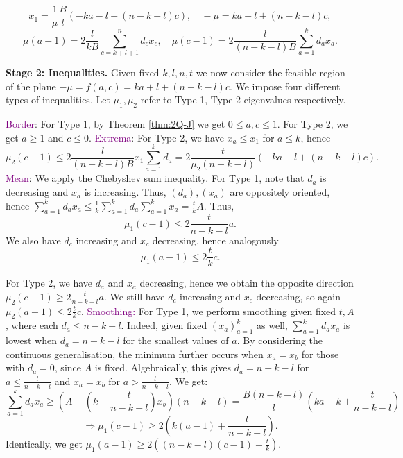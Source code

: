 \documentclass[11pt]{article}
\newcommand{\purp}[1]{\textcolor{purple}{#1}}
\begin{document}
\[x_1 = \frac{1}{\mu} \frac{B}{l} (-ka - l + (n-k-l)c), \quad -\mu = ka + l + (n-k-l)c,\]
\[\mu(a-1) = 2\frac{l}{kB} \sum_{c = k+l+1}^n d_cx_c, \quad \mu(c-1) = 2\frac{l}{(n-k-l)B} \sum_{a = 1}^k d_ax_a.\]
\vspace{3mm}

\textbf{Stage 2: Inequalities.} Given fixed $k, l, n, t$ we now consider the feasible region of the plane $-\mu = f(a, c) = ka + l + (n-k-l)c$. We impose four different types of inequalities. Let $\mu_1, \mu_2$ refer to Type 1, Type 2 eigenvalues respectively. 
\begin{outline}
    \1 \purp{Border}: For Type 1, by Theorem \ref{thm:2Q-J} we get $0 \le a, c \le 1$. For Type 2, we get $a \ge 1$ and $c \le 0$. 
    \1 \purp{Extrema}: For Type 2, we have $x_a \le x_1$ for $a \le k$, hence 
    \[\mu_2(c-1) \le 2\frac{l}{(n-k-l)B} x_1 \sum_{a = 1}^k d_a = 2\frac{t}{\mu_2(n-k-l)}(-ka - l + (n-k-l)c).\]
    \1 \purp{Mean}: We apply the Chebyshev sum inequality. For Type 1, note that $d_a$ is decreasing and $x_a$ is increasing. Thus, $(d_a), (x_a)$ are oppositely oriented, hence $\sum_{a=1}^k d_ax_a \le \frac1k \sum_{a=1}^k d_a \sum_{a=1}^k x_a = \frac{t}{k}A$. Thus, 
    \[\mu_1(c-1) \le 2\frac{t}{n-k-l}a.\]
    We also have $d_c$ increasing and $x_c$ decreasing, hence analogously
    \[\mu_1(a-1) \le 2\frac{t}{k}c.\]

    For Type 2, we have $d_a$ and $x_a$ decreasing, hence we obtain the opposite direction $\mu_2(c-1) \ge 2\frac{t}{n-k-l}a$. We still have $d_c$ increasing and $x_c$ decreasing, so again $\mu_2(a-1) \le 2\frac{t}{k}c$. 
    \1 \purp{Smoothing:} For Type 1, we perform smoothing given fixed $t, A$, where each $d_a \le n-k-l$. Indeed, given fixed $(x_a)_{a=1}^k$ as well, $\sum_{a=1}^k d_ax_a$ is lowest when $d_a = n-k-l$ for the smallest values of $a$. By considering the continuous generalisation, the minimum further occurs when $x_a = x_b$ for those with $d_a = 0$, since $A$ is fixed. Algebraically, this gives $d_a = n-k-l$ for $a \le \frac{t}{n-k-l}$ and $x_a = x_b$ for $a > \frac{t}{n-k-l}$. We get:
    \[\sum_{a=1}^k d_ax_a \ge (A - \left(k - \frac{t}{n-k-l}\right) x_b) (n-k-l) = \frac{B(n-k-l)}{l}\left(ka - k + \frac{t}{n-k-l}\right)\]
    \[\Rightarrow \mu_1(c-1) \ge 2(k(a-1) + \frac{t}{n-k-l}).\]
    Identically, we get $\mu_1(a-1) \ge 2((n-k-l)(c-1) + \frac{t}{k})$. 
\end{outline}
\end{document}
